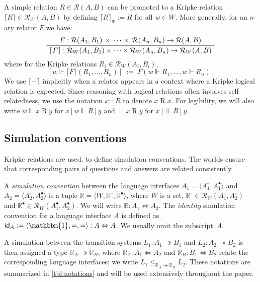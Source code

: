 \documentclass[sigplan,screen]{acmart}
\newcommand{\kw}[1]{\ensuremath{ \mathsf{#1} }}
\newcommand{\ifr}[1]{\mathrel{[{#1}]}}
\newcommand{\que}{\circ}
\newcommand{\ans}{\bullet}
\begin{document}
A simple relation $R \in \mathcal{R}(A, B)$
can be promoted to a Kripke relation
$\lceil R \rceil \in \mathcal{R}_W(A, B)$
by defining $\lceil R \rceil_w := R$ for all $w \in W$.
More generally, for an $n$-ary relator $F$ we have:
\[
  \AxiomC{$
    F :
      \mathcal{R}(A_1, B_1) \,\times\,\cdots\,\times\,\mathcal{R}(A_n, B_n)
      \rightarrow \mathcal{R}(A, B)$}
  \UnaryInfC{$
    \lceil F \rceil :
      \mathcal{R}_W(A_1, B_1) \times \cdots \times \mathcal{R}_W(A_n, B_n)
      \rightarrow \mathcal{R}_W(A, B)$}
  \DisplayProof
\]
where for the Kripke relations $R_i \in \mathcal{R}_W(A_i, B_i)$,
\[
  [w \Vdash \lceil F \rceil (R_1, \ldots, R_n)] \: := \:
    F(w \Vdash R_1, \ldots, w \Vdash R_n)
  \,.
\]
We use $\lceil - \rceil$ implicitly
when a relator appears in a context where
a Kripke logical relation is expected.
Since reasoning with logical relations
often involves self-relatedness,
we use the notation
$x :: R$ to denote $x \mathrel{R} x$.
For legibility, we will also write
$w \Vdash x \mathrel{R} y$ for $x \ifr{w \Vdash R} y$
and $\Vdash x \mathrel{R} y$ for $x \ifr{\Vdash R} y$.


\subsection{Simulation conventions} \label{sec:simconv} %

Kripke relations are used.
to define simulation conventions.
The worlds ensure that corresponding pairs of
questions and answers are related consistently.

\begin{definition} \label{def:simconv} %
A \emph{simulation convention} between the language interfaces
$A_1 = \langle A_1^\que, A_1^\ans \rangle$ and
$A_2 = \langle A_2^\que, A_2^\ans \rangle$
is a tuple $\mathbb{R} = \langle W, \mathbb{R}^\que, \mathbb{R}^\ans \rangle$,
where $W$ is a set,
$\mathbb{R}^\que \in \mathcal{R}_W(A_1^\que, A_2^\que)$
and $\mathbb{R}^\ans \in \mathcal{R}_W(A_1^\ans, A_2^\ans)$.
We will write $\mathbb{R} : A_1 \Leftrightarrow A_2$.
The \emph{identity} simulation convention
for a language interface $A$
is defined as
$\kw{id}_A := \langle \mathbbm{1}, {=}, {=} \rangle
  : A \Leftrightarrow A$.
We usually omit the subscript~$A$.
\end{definition}

A simulation between the transition systems
$L_1 : A_1 \twoheadrightarrow B_1$ and
$L_2 : A_2 \twoheadrightarrow B_2$
is then assigned a type $\mathbb{R}_A \twoheadrightarrow \mathbb{R}_B$,
where %
$\mathbb{R}_A : A_1 \Leftrightarrow A_2$ and
$\mathbb{R}_B : B_1 \Leftrightarrow B_2$
relate the corresponding language interfaces;
we write
$L_1 \le_{\mathbb{R}_A \twoheadrightarrow \mathbb{R}_B} L_2$.
These notations are summarized in \autoref{tbl:notations}
and will be used extensively throughout the paper.
\end{document}
